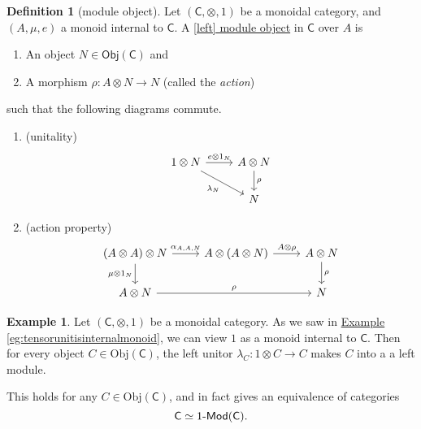 \documentclass[a4paper,10pt]{scrreprt}
\newcommand{\defn}[1]{\ul{#1}}
\newcommand{\Obj}{\mathrm{Obj}}
\def\mhyp{{\hbox{-}}}
\theoremstyle{definition}
\newtheorem{definition}{Definition}[section]
\newtheorem{example}{Example}[section]
\theoremstyle{plain}
\theoremstyle{remark}
\begin{document}
\begin{definition}[module object]
  \label{def:moduleobject}
  Let $(\mathsf{C}, \otimes, 1)$ be a monoidal category, and $(A, \mu, e)$ a monoid internal to $\mathsf{C}$. A \defn{[left] module object} in $\mathsf{C}$ over $A$ is
  \begin{enumerate}
    \item An object $N \in \mathsf{Obj}(\mathsf{C})$ and

    \item A morphism $\rho\colon A \otimes N \to N$ (called the \emph{action})
  \end{enumerate}
  such that the following diagrams commute.
  \begin{enumerate}
    \item (unitality)
      \begin{equation*}
        \begin{tikzcd}
          1 \otimes N
          \arrow[r, "e \otimes 1_{N}"]
          \arrow[dr, swap, "\lambda_{N}"]
          & A \otimes N
          \arrow[d, "\rho"]
          \\
          & N
        \end{tikzcd}
      \end{equation*}

    \item (action property)
      \begin{equation*}
        \begin{tikzcd}
          (A \otimes A) \otimes N
          \arrow[r, "{\alpha_{A, A, N}}"]
          \arrow[d, swap, "\mu \otimes 1_{N}"]
          & A \otimes (A \otimes N)
          \arrow[r, "A \otimes \rho"]
          & A \otimes N
          \arrow[d, "\rho"]
          \\
          A \otimes N
          \arrow[rr, "\rho"]
          & & N
        \end{tikzcd}
      \end{equation*}
  \end{enumerate}
\end{definition}

\begin{example}
  \label{eg:categoryof1modulesisequivalenttocategoryitself}
  Let $(\mathsf{C}, \otimes, 1)$ be a monoidal category. As we saw in \hyperref[eg:tensorunitisinternalmonoid]{Example \ref*{eg:tensorunitisinternalmonoid}}, we can view $1$ as a monoid internal to $\mathsf{C}$. Then for every object $C \in \Obj(\mathsf{C})$, the left unitor $\lambda_{C}\colon 1 \otimes C \to C$ makes $C$ into a a left module.

  This holds for any $C \in \Obj(\mathsf{C})$, and in fact gives an equivalence of categories
  \begin{equation*}
    \mathsf{C} \simeq 1\mhyp\mathsf{Mod}(\mathsf{C}).
  \end{equation*}
\end{example}
\end{document}
